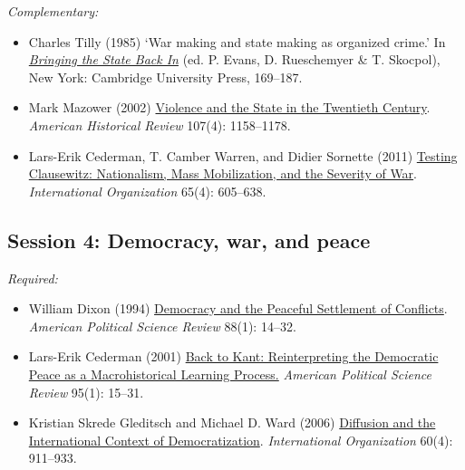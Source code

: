 \documentclass[12pt, a4paper]{article}
\begin{document}
\noindent\textit{Complementary:}

\begin{itemize}
  \item Charles Tilly (1985) `War making and state making as organized crime.' In \href{https://bibliotecas.uc3m.es/permalink/f/1qk6at5/34UC3M_ALMA21176158990004213}{\textit{Bringing the State Back In}} (ed. P. Evans, D. Rueschemyer \& T. Skocpol), New York: Cambridge University Press, 169--187.
	\item Mark Mazower (2002) \href{https://doi.org/10.1086/ahr/107.4.1158}{Violence and the State in the Twentieth Century}. \textit{American Historical Review} 107(4): 1158--1178.
	\item Lars-Erik Cederman, T.	Camber Warren, and Didier Sornette (2011) \href{https://doi.org/10.1017/S0020818311000245}{Testing Clausewitz: Nationalism, Mass Mobilization, and the Severity of War}. \textit{International Organization} 65(4): 605--638.
\end{itemize}

\vspace{20pt}
\hline
\subsection*{Session 4: Democracy, war, and peace}



\noindent\textit{Required:}

\begin{itemize}
	\item William Dixon (1994) \href{https://doi.org/10.2307/2944879}{Democracy and the Peaceful Settlement of Conflicts}. \textit{American Political Science Review} 88(1): 14--32.
  \item Lars-Erik Cederman (2001) \href{https://doi.org/10.1017/S0003055401000028}{Back to Kant: Reinterpreting the Democratic Peace as a Macrohistorical Learning Process.} \textit{American Political Science Review} 95(1): 15--31.
	\item Kristian Skrede Gleditsch and Michael D. Ward (2006) \href{https://doi.org/10.1017/S0020818306060309}{Diffusion and the International Context of Democratization}. \textit{International Organization} 60(4): 911--933.
	\end{itemize}
\end{document}
